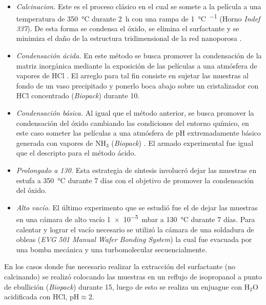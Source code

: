 				\begin{itemize}

				\item \textit{Calcinacion.} Este es el proceso clásico en el cual se somete a la película a una temperatura de \SI{350}{\celsius} durante \SI{2}{\hour} con una rampa de \SI{1}{\celsius.\min^{-1}} (Horno \textit{Indef 337}). De esta forma se condensa el óxido, se elimina el surfactante y se minimiza el daño de la estructura tridimensional de la red nanoporosa \cite{Crepaldi2003}.

				\item \textit{Condensación ácida.} En este método se busca promover la condensación de la matriz inorgánica mediante la exposición de las películas a una atmósfera de vapores de HCl \cite{Doshi2000a}. El arreglo para tal fin consiste en sujetar las muestras al fondo de un vaso precipitado y ponerlo boca abajo sobre un cristalizador con HCl concentrado (\textit{Biopack}) durante \SI{10}{\min}. 

				\item \textit{Condensación básica.} Al igual que el método anterior, se busca promover la condensación del óxido cambiando las condiciones del entorno químico, en este caso someter las películas a una atmósfera de pH extremadamente básico generada con vapores de NH$_3$ (\textit{Biopack}) \cite{Soler-Illia2012,Soler-Illia2011}. El armado experimental fue igual que el descripto para el método ácido.

				\item \textit{Prolongado a 130.} Esta estrategia de síntesis involucró dejar las muestras en estufa a \SI{350}{\celsius} durante 7 días con el objetivo de promover la condensación del óxido.

				\item \textit{Alto vacío.} El último experimento que se estudió fue  el de dejar las muestras en una cámara de alto vacío \SI{1e-5}{\milli\bar} a \SI{130}{\celsius} durante 7 días. Para calentar y lograr el vacío necesario se utilizó la cámara de una soldadura de obleas (\textit{EVG 501 Manual Wafer Bonding System}) la cual fue evacuada por una bomba mecánica y una turbomolecular secuencialmente.

				\end{itemize}
					
		En los casos donde fue necesario realizar la extracción del surfactante (no calcinando) se realizó colocando las muestras en un reflujo de isopropanol a punto de ebullición (\textit{Biopack}) durante \SI{15}{\min}, luego de esto se realiza un enjuague con H$_2$O acidificada con HCl, pH$\approx$2.
			  
